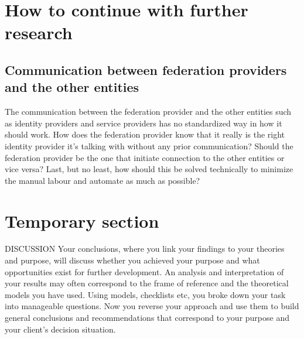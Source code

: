 \section{How to continue with further research}
\subsection{Communication between federation providers and the other entities}
The communication between the federation provider and the other entities such as identity providers and service providers has no standardized way in how it should work.
How does the federation provider know that it really is the right identity provider it's talking with without any prior communication?
Should the federation provider be the one that initiate connection to the other entities or vice versa?
Last, but no least, how should this be solved technically to minimize the manual labour and automate as much as possible?

\section{Temporary section }
DISCUSSION Your conclusions, where you link your findings to your theories and purpose,
will discuss whether you achieved your purpose and what opportunities exist for further
development. An analysis and interpretation of your results may often correspond to the
frame of reference and the theoretical models you have used. Using models, checklists etc,
you broke down your task into manageable questions. Now you reverse your approach and
use them to build general conclusions and recommendations that correspond to your
purpose and your client's decision situation.

